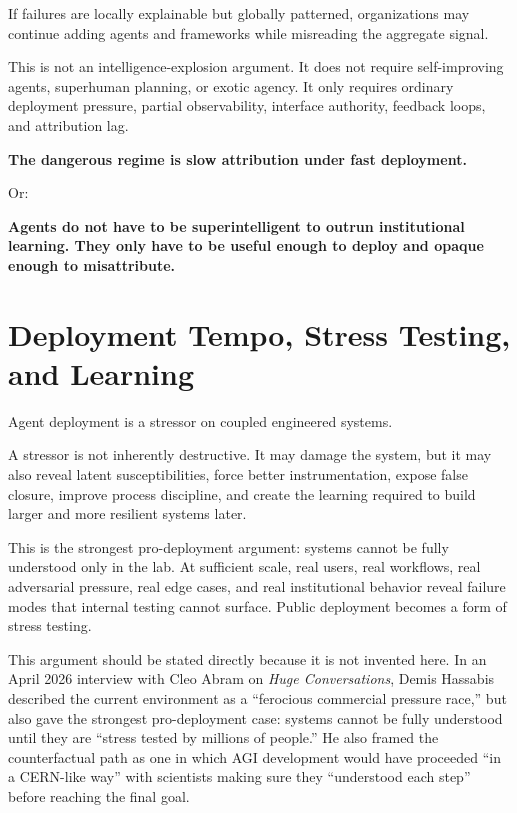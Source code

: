 \documentclass[11pt]{article}
\begin{document}
If failures are locally explainable but globally patterned, organizations may continue adding agents and frameworks while misreading the aggregate signal.

This is not an intelligence-explosion argument. It does not require self-improving agents, superhuman planning, or exotic agency. It only requires ordinary deployment pressure, partial observability, interface authority, feedback loops, and attribution lag.

\begin{pullquote}
\textbf{The dangerous regime is slow attribution under fast deployment.}
\end{pullquote}

Or:

\begin{pullquote}
\textbf{Agents do not have to be superintelligent to outrun institutional learning. They only have to be useful enough to deploy and opaque enough to misattribute.}
\end{pullquote}

\section{Deployment Tempo, Stress Testing, and Learning}

Agent deployment is a stressor on coupled engineered systems.

A stressor is not inherently destructive. It may damage the system, but it may also reveal latent susceptibilities, force better instrumentation, expose false closure, improve process discipline, and create the learning required to build larger and more resilient systems later.

This is the strongest pro-deployment argument: systems cannot be fully understood only in the lab. At sufficient scale, real users, real workflows, real adversarial pressure, real edge cases, and real institutional behavior reveal failure modes that internal testing cannot surface. Public deployment becomes a form of stress testing.

This argument should be stated directly because it is not invented here. In an April 2026 interview with Cleo Abram on \emph{Huge Conversations}, Demis Hassabis described the current environment as a ``ferocious commercial pressure race,'' but also gave the strongest pro-deployment case: systems cannot be fully understood until they are ``stress tested by millions of people.'' He also framed the counterfactual path as one in which AGI development would have proceeded ``in a CERN-like way'' with scientists making sure they ``understood each step'' before reaching the final goal.
\end{document}
